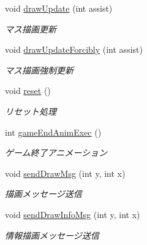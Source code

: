 \begin{DoxyCompactItemize}
void \hyperlink{classjp_1_1gr_1_1java__conf_1_1yuta__yoshinaga_1_1reversi_1_1model_1_1_reversi_play_a0522dfef43ea5a95aaa2086c22fcefe0}{draw\+Update} (int assist)
\begin{DoxyCompactList}\small\item\em マス描画更新 \end{DoxyCompactList}\item 
void \hyperlink{classjp_1_1gr_1_1java__conf_1_1yuta__yoshinaga_1_1reversi_1_1model_1_1_reversi_play_a216cece80255198785a95ccbaf1cef53}{draw\+Update\+Forcibly} (int assist)
\begin{DoxyCompactList}\small\item\em マス描画強制更新 \end{DoxyCompactList}\item 
void \hyperlink{classjp_1_1gr_1_1java__conf_1_1yuta__yoshinaga_1_1reversi_1_1model_1_1_reversi_play_a040fddf6e59c00de4c9c2ecdaedcb574}{reset} ()
\begin{DoxyCompactList}\small\item\em リセット処理 \end{DoxyCompactList}\item 
int \hyperlink{classjp_1_1gr_1_1java__conf_1_1yuta__yoshinaga_1_1reversi_1_1model_1_1_reversi_play_aaf0f07bdc219b6d8ec5551457fb551ab}{game\+End\+Anim\+Exec} ()
\begin{DoxyCompactList}\small\item\em ゲーム終了アニメーション \end{DoxyCompactList}\item 
void \hyperlink{classjp_1_1gr_1_1java__conf_1_1yuta__yoshinaga_1_1reversi_1_1model_1_1_reversi_play_a93ebdb5fb7097984730a85f62ebb57d7}{send\+Draw\+Msg} (int y, int x)
\begin{DoxyCompactList}\small\item\em 描画メッセージ送信 \end{DoxyCompactList}\item 
void \hyperlink{classjp_1_1gr_1_1java__conf_1_1yuta__yoshinaga_1_1reversi_1_1model_1_1_reversi_play_a866c2788aa9dd7eb2084da9fc5e5bd5c}{send\+Draw\+Info\+Msg} (int y, int x)
\begin{DoxyCompactList}\small\item\em 情報描画メッセージ送信 \end{DoxyCompactList}\end{DoxyCompactItemize}
